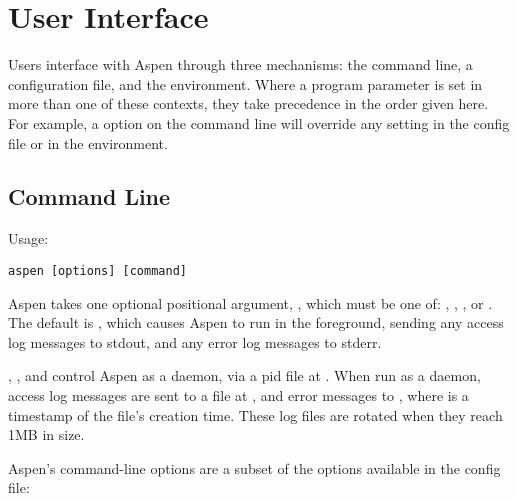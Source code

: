 \chapter{User Interface \label{interface}}

Users interface with Aspen through three mechanisms: the command line, a
configuration file, and the environment. Where a program parameter is set in
more than one of these contexts, they take precedence in the order given here.
For example, a  option on the command line will override any
 setting in the config file or in the environment.


\section{Command Line \label{command-line}}

Usage:

\begin{verbatim}
aspen [options] [command]
\end{verbatim}

Aspen takes one optional positional argument, , which must be one
of: , , , or . The default is
, which causes Aspen to run in the foreground, sending any access
log messages to stdout, and any error log messages to stderr.

, , and  control Aspen as a daemon, via a
pid file at . When run as a daemon, access log messages
are sent to a file at , and error messages to
, where  is a timestamp of the file's
creation time. These log files are rotated when they reach 1MB in size.


Aspen's command-line options are a subset of the options available in the config
file:

